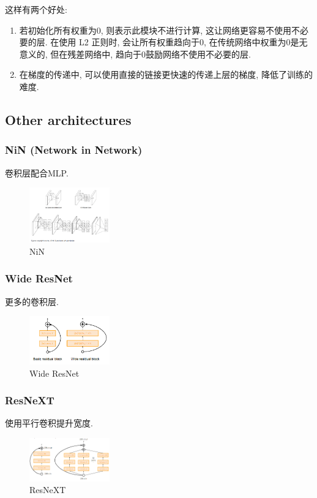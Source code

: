 这样有两个好处:
\begin{enumerate}
    \item 若初始化所有权重为0, 则表示此模块不进行计算, 这让网络更容易不使用不必要的层. 在使用 L2 正则时, 会让所有权重趋向于0, 在传统网络中权重为0是无意义的, 但在残差网络中, 趋向于0鼓励网络不使用不必要的层. 
    \item 在梯度的传递中, 可以使用直接的链接更快速的传递上层的梯度, 降低了训练的难度. 
\end{enumerate}

\subsection{Other architectures}
\subsubsection{NiN (Network in Network)}
卷积层配合MLP. 

\begin{figure}[!htb]
    \centering
    \includegraphics[width=0.309\textwidth]{pic/Lec9/NiN.png}
    \caption{NiN}
\end{figure}

\subsubsection{Wide ResNet}
更多的卷积层. 
\begin{figure}[!htb]
    \centering
    \includegraphics[width=0.309\textwidth]{pic/Lec9/Wide ResNet}
    \caption{Wide ResNet}
\end{figure}

\subsubsection{ResNeXT}
使用平行卷积提升宽度. 

\begin{figure}[!htb]
    \centering
    \includegraphics[width=0.309\textwidth]{pic/Lec9/ResNeXT}
    \caption{ResNeXT}
\end{figure}

